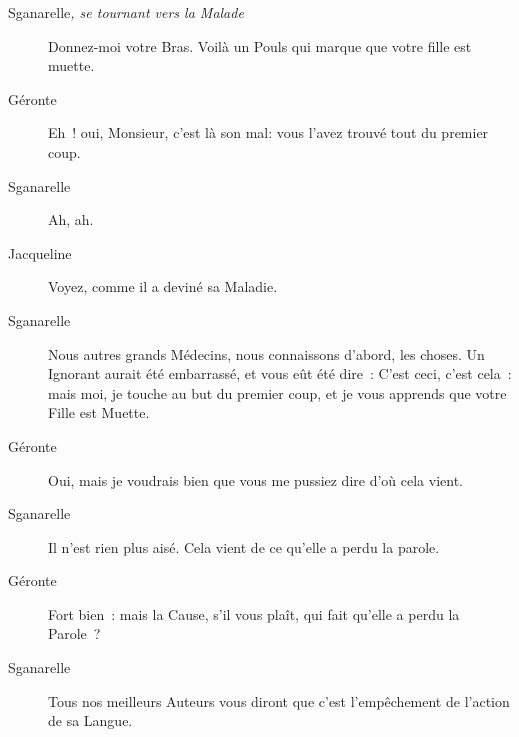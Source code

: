 \documentclass[french,twoside]{book} %
\begin{document}
 \begin{description} \item[Sganarelle\textit{, se tournant vers la Malade}\par
] 

Donnez-moi votre Bras. Voilà un Pouls qui marque que votre fille est muette.\end{description}
 \begin{description} \item[Géronte] 

Eh ! oui, Monsieur, c’est là son mal: vous l’avez trouvé tout du premier coup.\end{description}
 \begin{description} \item[Sganarelle] 

Ah, ah.\end{description}
 \begin{description} \item[Jacqueline] 

Voyez, comme il a deviné sa Maladie.\end{description}
 \begin{description} \item[Sganarelle] 

Nous autres grands Médecins, nous connaissons d’abord, les choses. Un Ignorant aurait été embarrassé, et vous eût été dire : C’est ceci, c’est cela : mais moi, je touche au but du premier coup, et je vous apprends que votre Fille est Muette.\end{description}
 \begin{description} \item[Géronte] 

Oui, mais je voudrais bien que vous me pussiez dire d’où cela vient.\end{description}
 \begin{description} \item[Sganarelle] 

Il n’est rien plus aisé. Cela vient de ce qu’elle a perdu la parole.\end{description}
 \begin{description} \item[Géronte] 

Fort bien : mais la Cause, s’il vous plaît, qui fait qu’elle a perdu la Parole ?\end{description}
 \begin{description} \item[Sganarelle] 

Tous nos meilleurs Auteurs vous diront que c’est l’empêchement de l’action de sa Langue.\end{description}
\end{document}
